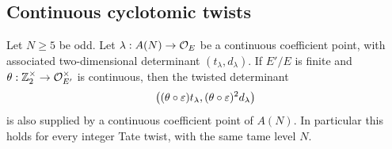 \subsection{Continuous cyclotomic twists}

\begin{proposition}\label{prop:hecke-twists}
Let $N\geq5$ be odd.  Let $\lambda:A(N)\to\mathcal O_E$ be a continuous
coefficient point, with associated two-dimensional determinant
$(t_\lambda,d_\lambda)$.  If $E'/E$ is finite and
$\theta:\mathbb Z_2^\times\to\mathcal O_{E'}^\times$ is continuous, then
the twisted determinant
\[
 \bigl((\theta\circ\varepsilon)t_\lambda,
       (\theta\circ\varepsilon)^2d_\lambda\bigr)
\]
is also supplied by a continuous coefficient point of $A(N)$.
In particular this holds for every integer Tate twist, with the
same tame level $N$.
\end{proposition}

